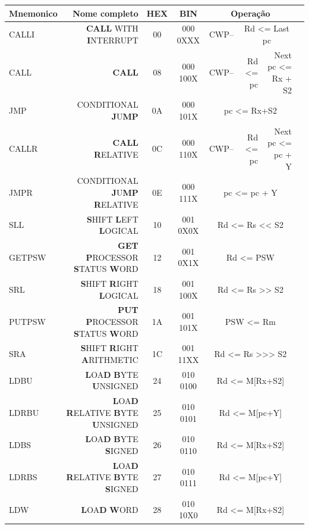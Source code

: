 \documentclass[
	article,			%
	11pt,				%
	oneside,			%
	a4paper,			%
	english,			%
	brazil,				%
	sumario=tradicional
	]{abntex2}
\begin{document}
\begin{table}[!htp]\centering
\fontsize{6.5pt}{10.25pt}\selectfont
\begin{tabular}{lrccrrrr}\toprule
\cellcolor[HTML]{A8A8A8}Mnemonico &\cellcolor[HTML]{A8A8A8}Nome completo &\cellcolor[HTML]{A8A8A8}HEX &\cellcolor[HTML]{A8A8A8}BIN &\multicolumn{3}{c}{\cellcolor[HTML]{A8A8A8}Operação} \\\midrule
CALLI &\textbf{CALL} WITH \textbf{I}NTERRUPT &00 &000 0XXX &CWP-- &\multicolumn{2}{c}{Rd <= Last pc} \\
CALL &\textbf{CALL} &08 &000 100X &CWP-- &Rd <= pc &Next pc <= Rx + S2 \\
JMP &CONDITIONAL \textbf{J}U\textbf{MP} &0A &000 101X &\multicolumn{3}{c}{pc <= Rx+S2} \\
CALLR &\textbf{CALL} \textbf{R}ELATIVE &0C &000 110X &CWP-- &Rd <= pc &Next pc <= pc + Y \\
JMPR &CONDITIONAL \textbf{J}U\textbf{MP} \textbf{R}ELATIVE &0E &000 111X &\multicolumn{3}{c}{pc <= pc + Y} \\
SLL &\textbf{S}HIFT \textbf{L}EFT \textbf{L}OGICAL &10 &001 0X0X &\multicolumn{3}{c}{Rd <= Rs << S2} \\
GETPSW &\textbf{GET} \textbf{P}ROCESSOR \textbf{S}TATUS \textbf{W}ORD &12 &001 0X1X &\multicolumn{3}{c}{Rd <= PSW} \\
SRL &\textbf{S}HIFT \textbf{R}IGHT \textbf{L}OGICAL &18 &001 100X &\multicolumn{3}{c}{Rd <= Rs >> S2} \\
PUTPSW &\textbf{PUT} \textbf{P}ROCESSOR \textbf{S}TATUS \textbf{W}ORD &1A &001 101X &\multicolumn{3}{c}{PSW <= Rm} \\
SRA &\textbf{S}HIFT \textbf{R}IGHT \textbf{A}RITHMETIC &1C &001 11XX &\multicolumn{3}{c}{Rd <= Rs >>> S2} \\
LDBU &\textbf{L}OA\textbf{D} \textbf{B}YTE \textbf{U}NSIGNED &24 &010 0100 &\multicolumn{3}{c}{Rd <= M[Rx+S2]} \\
LDRBU &\textbf{L}OA\textbf{D} \textbf{R}ELATIVE \textbf{B}YTE \textbf{U}NSIGNED &25 &010 0101 &\multicolumn{3}{c}{Rd <= M[pc+Y]} \\
LDBS &\textbf{L}OA\textbf{D} \textbf{B}YTE \textbf{S}IGNED &26 &010 0110 &\multicolumn{3}{c}{Rd <= M[Rx+S2]} \\
LDRBS &\textbf{L}OA\textbf{D} \textbf{R}ELATIVE \textbf{B}YTE \textbf{S}IGNED &27 &010 0111 &\multicolumn{3}{c}{Rd <= M[pc+Y]} \\
LDW &\textbf{L}OA\textbf{D} \textbf{W}ORD &28 &010 10X0 &\multicolumn{3}{c}{Rd <= M[Rx+S2]} \\

\end{tabular}
\end{table}
\end{document}
